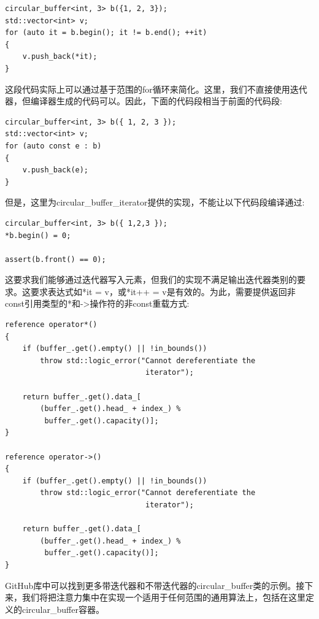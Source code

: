 \begin{lstlisting}[style=styleCXX]
circular_buffer<int, 3> b({1, 2, 3});
std::vector<int> v;
for (auto it = b.begin(); it != b.end(); ++it)
{
	v.push_back(*it);
}
\end{lstlisting}

这段代码实际上可以通过基于范围的for循环来简化。这里，我们不直接使用迭代器，但编译器生成的代码可以。因此，下面的代码段相当于前面的代码段:

\begin{lstlisting}[style=styleCXX]
circular_buffer<int, 3> b({ 1, 2, 3 });
std::vector<int> v;
for (auto const e : b)
{
	v.push_back(e);
}
\end{lstlisting}

但是，这里为circular\_buffer\_iterator提供的实现，不能让以下代码段编译通过:

\begin{lstlisting}[style=styleCXX]
circular_buffer<int, 3> b({ 1,2,3 });
*b.begin() = 0;

assert(b.front() == 0);
\end{lstlisting}

这要求我们能够通过迭代器写入元素，但我们的实现不满足输出迭代器类别的要求。这要求表达式如*it = v，或*it++ = v是有效的。为此，需要提供返回非const引用类型的*和->操作符的非const重载方式:

\begin{lstlisting}[style=styleCXX]
reference operator*()
{
	if (buffer_.get().empty() || !in_bounds())
		throw std::logic_error("Cannot dereferentiate the
								iterator");
	
	return buffer_.get().data_[
		(buffer_.get().head_ + index_) %
		 buffer_.get().capacity()];
}

reference operator->()
{
	if (buffer_.get().empty() || !in_bounds())
		throw std::logic_error("Cannot dereferentiate the
								iterator");
								
	return buffer_.get().data_[
		(buffer_.get().head_ + index_) %
		 buffer_.get().capacity()];
}
\end{lstlisting}

GitHub库中可以找到更多带迭代器和不带迭代器的circular\_buffer类的示例。接下来，我们将把注意力集中在实现一个适用于任何范围的通用算法上，包括在这里定义的circular\_buffer容器。






















